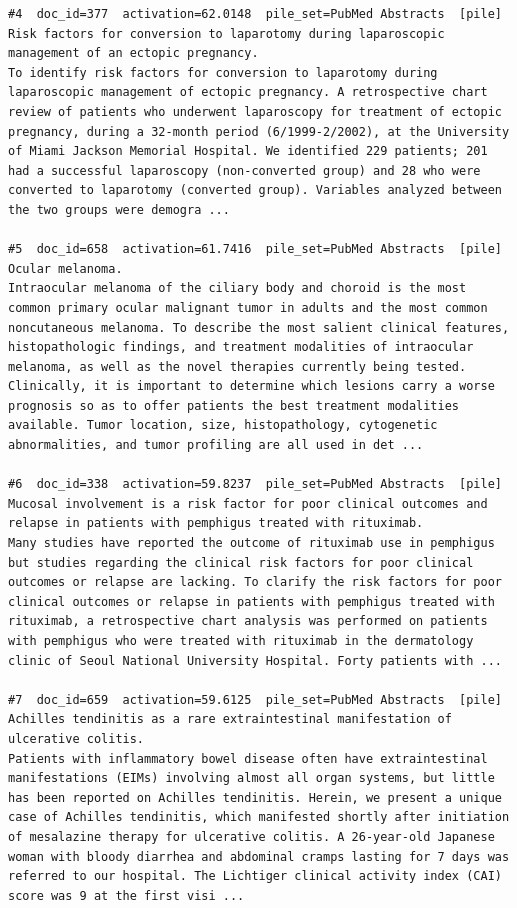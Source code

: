 \begin{verbatim}
#4  doc_id=377  activation=62.0148  pile_set=PubMed Abstracts  [pile]
Risk factors for conversion to laparotomy during laparoscopic management of an ectopic pregnancy.
To identify risk factors for conversion to laparotomy during laparoscopic management of ectopic pregnancy. A retrospective chart review of patients who underwent laparoscopy for treatment of ectopic pregnancy, during a 32-month period (6/1999-2/2002), at the University of Miami Jackson Memorial Hospital. We identified 229 patients; 201 had a successful laparoscopy (non-converted group) and 28 who were converted to laparotomy (converted group). Variables analyzed between the two groups were demogra ...

#5  doc_id=658  activation=61.7416  pile_set=PubMed Abstracts  [pile]
Ocular melanoma.
Intraocular melanoma of the ciliary body and choroid is the most common primary ocular malignant tumor in adults and the most common noncutaneous melanoma. To describe the most salient clinical features, histopathologic findings, and treatment modalities of intraocular melanoma, as well as the novel therapies currently being tested. Clinically, it is important to determine which lesions carry a worse prognosis so as to offer patients the best treatment modalities available. Tumor location, size, histopathology, cytogenetic abnormalities, and tumor profiling are all used in det ...

#6  doc_id=338  activation=59.8237  pile_set=PubMed Abstracts  [pile]
Mucosal involvement is a risk factor for poor clinical outcomes and relapse in patients with pemphigus treated with rituximab.
Many studies have reported the outcome of rituximab use in pemphigus but studies regarding the clinical risk factors for poor clinical outcomes or relapse are lacking. To clarify the risk factors for poor clinical outcomes or relapse in patients with pemphigus treated with rituximab, a retrospective chart analysis was performed on patients with pemphigus who were treated with rituximab in the dermatology clinic of Seoul National University Hospital. Forty patients with ...

#7  doc_id=659  activation=59.6125  pile_set=PubMed Abstracts  [pile]
Achilles tendinitis as a rare extraintestinal manifestation of ulcerative colitis.
Patients with inflammatory bowel disease often have extraintestinal manifestations (EIMs) involving almost all organ systems, but little has been reported on Achilles tendinitis. Herein, we present a unique case of Achilles tendinitis, which manifested shortly after initiation of mesalazine therapy for ulcerative colitis. A 26-year-old Japanese woman with bloody diarrhea and abdominal cramps lasting for 7 days was referred to our hospital. The Lichtiger clinical activity index (CAI) score was 9 at the first visi ...


\end{verbatim}
